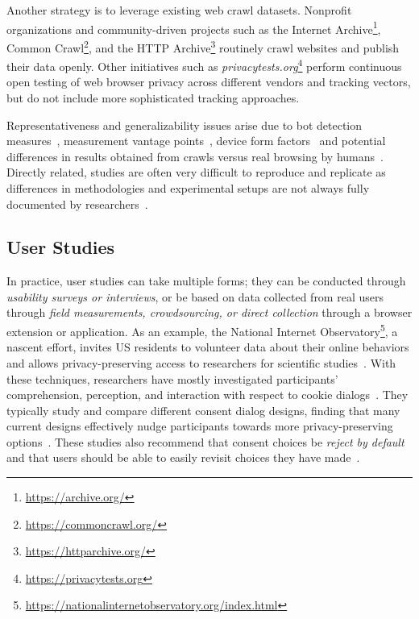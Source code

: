 Another strategy is to leverage existing web crawl datasets. Nonprofit organizations and community-driven projects such as the Internet Archive\footnote{\url{https://archive.org/}}, Common Crawl\footnote{\url{https://commoncrawl.org/}}, and the HTTP Archive\footnote{\url{https://httparchive.org/}} routinely crawl websites and publish their data openly. Other initiatives such as \textit{privacytests.org}\footnote{\url{https://privacytests.org}} perform continuous open testing of web browser privacy across different vendors and tracking vectors, but do not include more sophisticated tracking approaches. 

 Representativeness and generalizability issues arise due to 
bot detection measures~\cite{krumnowHowGullibleAre2022},
measurement vantage points~\cite{samarasingheGlobalPerspectiveWeb2019},
device form factors~\cite{yangComparativeMeasurementStudy2020,casselOmniCrawlComprehensiveMeasurement2022}
and potential differences in results obtained from crawls versus real browsing by humans~\cite{zeberRepresentativenessAutomatedWeb2020}. Directly related, studies are often very difficult to reproduce and replicate as differences in methodologies and experimental setups are not always fully documented by researchers~\cite{demirReproducibilityReplicabilityWeb2022,hantkeWebExecutionBundles2025}.

\subsection{User Studies}
\label{sec:user-studies}

In practice, user studies can take multiple forms; they can be conducted through \textit{usability surveys or interviews}, or be based on data collected from real users through \textit{field measurements, crowdsourcing, or direct collection} through a browser extension or application. As an example, the National Internet Observatory\footnote{\url{https://nationalinternetobservatory.org/index.html}}, a nascent effort, invites US residents to volunteer data about their online behaviors and allows privacy-preserving access to researchers for scientific studies~\cite{steningUnprecedentedDataCollection2022,callahanCanWeBetter2021,fealIntroductionNationalInternet2024}.
%
With these techniques, researchers have mostly investigated participants’ comprehension, perception, and interaction with respect to cookie  dialogs~\cite{birrellSoKTechnicalImplementation2024,machuletzMultiplePurposesMultiple2020,bermejofernandezThisWebsiteUses2021,habibOkayWhateverEvaluation2022,singhWhatCookieConsent2022,bielovaSurveyAcademicStudies2022,Bielova2024-zr}. They typically study and compare different consent dialog designs, finding that many current designs effectively nudge participants towards more privacy-preserving options~\cite{machuletzMultiplePurposesMultiple2020,bermejofernandezThisWebsiteUses2021}. These studies also recommend that consent choices be \textit{reject by default} and that users should be able to easily revisit choices they have made~\cite{habibOkayWhateverEvaluation2022,Kanc-etal-25-PETs}.